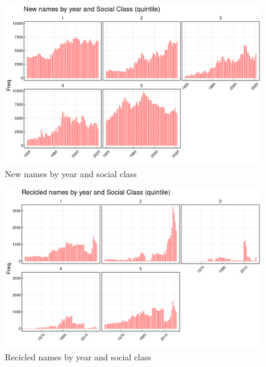 \begin{figure}[H]
\begin{center}
    \includegraphics[width=15cm]{plot/p1.png}
    \caption{New names by year and social class}
    \label{fig:new_names}
\end{center}
\end{figure}


\begin{figure}[H]
\begin{center}
    \includegraphics[width=15cm]{plot/p2.png}
    \caption{Recicled names by year and social class}
    \label{fig:new_names}
\end{center}
\end{figure}

